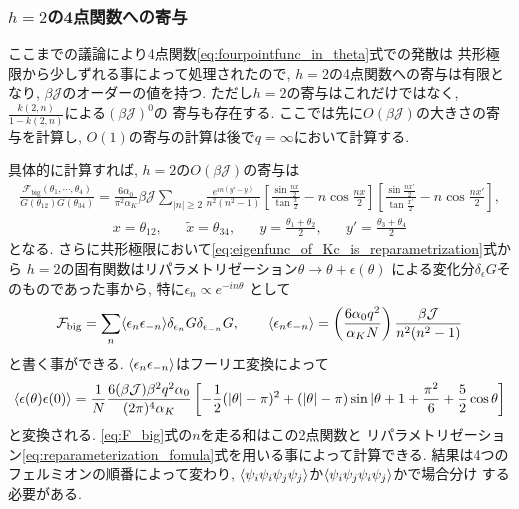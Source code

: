 \subsubsection{$h = 2$の4点関数への寄与}
ここまでの議論により4点関数\eqref{eq:fourpointfunc_in_theta}式での発散は
共形極限から少しずれる事によって処理されたので, $h=2$の4点関数への寄与は有限となり, 
$\beta\mathcal{J}$のオーダーの値を持つ. 
ただし$h=2$の寄与はこれだけではなく, $\frac{k(2,n)}{1-k(2,n)}$による$(\beta\mathcal{J})^0$の
寄与も存在する. 
ここでは先に$O(\beta\mathcal{J})$の大きさの寄与を計算し, 
$O(1)$の寄与の計算は後で$q=\infty$において計算する. 

具体的に計算すれば, $h=2$の$O(\beta\mathcal{J})$の寄与は
\begin{align}
	\frac{\mathcal{F}_{\mathrm{big}}(\theta_1,\cdots,\theta_4)}{G(\theta_{12})G(\theta_{34})}
	= \frac{6\alpha_0}{\pi^2\alpha_K}\beta\mathcal{J}\sum_{|n|\geq 2}
		\frac{e^{in(y' - y)}}{n^2(n^2 - 1)}
		\left[
			\frac{\sin\frac{nx}{2}}{\tan\frac{x}{2}} - n\cos\frac{nx}{2}
		\right]
		\left[
			\frac{\sin\frac{nx'}{2}}{\tan\frac{x'}{2}} - n\cos\frac{nx'}{2}
		\right],
	\label{eq:F_big}
\end{align}
\begin{align}
	x = \theta_{12},\hspace{20pt}
	\tilde{x} = \theta_{34},\hspace{20pt}
	y = \frac{\theta_1 + \theta_2}{2},\hspace{20pt}
	y' = \frac{\theta_3 + \theta_4}{2}
\end{align}
となる. 
さらに共形極限において\eqref{eq:eigenfunc_of_Kc_is_reparametrization}式から
$h=2$の固有関数はリパラメトリゼーション$\theta\to\theta + \epsilon(\theta)$
による変化分$\delta_{\epsilon}G$そのものであった事から, 特に$\epsilon_n \propto e^{-in\theta}$
として
\begin{align}
	\mathcal{F}_{\mathrm{big}} = 
	\sum_n \langle \epsilon_n\epsilon_{-n} \rangle\delta_{\epsilon_n}G\delta_{\epsilon_{-n}}G,
	\hspace{20pt}
	\langle \epsilon_n\epsilon_{-n} \rangle = 
	\left(\frac{6\alpha_0q^2}{\alpha_K N}\right)\frac{\beta\mathcal{J}}{n^2(n^2-1)}
\end{align}
と書く事ができる. 
$\langle \epsilon_n\epsilon_{-n} \rangle$はフーリエ変換によって
\begin{align}
	\langle \epsilon(\theta)\epsilon(0) \rangle
	= \frac{1}{N}\frac{6(\beta\mathcal{J}) \beta^2 q^2 \alpha_0}{(2\pi)^4 \alpha_K}
	\left[
		-\frac{1}{2}(|\theta| - \pi)^2 + (|\theta| - \pi)\sin|\theta
		+ 1 + \frac{\pi^2}{6} + \frac{5}{2}\cos\theta
	\right]
	\label{eq:propagator_of_epsilon}
\end{align}
と変換される. 
\eqref{eq:F_big}式の$n$を走る和はこの2点関数と
リパラメトリゼーション\eqref{eq:reparameterization_fomula}式を用いる事によって計算できる. 
結果は4つのフェルミオンの順番によって変わり, 
$\langle \psi_i\psi_i\psi_j\psi_j \rangle$か$\langle \psi_i\psi_j\psi_i\psi_j \rangle$かで場合分け
する必要がある. 

